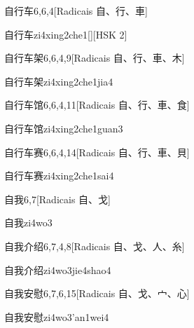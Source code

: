 \begin{entry}{自行车}{6,6,4}[Radicais ⾃、⾏、⾞]
  \begin{phonetics}{自行车}{zi4xing2che1}[][HSK 2]
  \end{phonetics}
\end{entry}

\begin{entry}{自行车架}{6,6,4,9}[Radicais ⾃、⾏、⾞、⽊]
  \begin{phonetics}{自行车架}{zi4xing2che1jia4}
  \end{phonetics}
\end{entry}

\begin{entry}{自行车馆}{6,6,4,11}[Radicais ⾃、⾏、⾞、⾷]
  \begin{phonetics}{自行车馆}{zi4xing2che1guan3}
  \end{phonetics}
\end{entry}

\begin{entry}{自行车赛}{6,6,4,14}[Radicais ⾃、⾏、⾞、⾙]
  \begin{phonetics}{自行车赛}{zi4xing2che1sai4}
  \end{phonetics}
\end{entry}

\begin{entry}{自我}{6,7}[Radicais ⾃、⼽]
  \begin{phonetics}{自我}{zi4wo3}
  \end{phonetics}
\end{entry}

\begin{entry}{自我介绍}{6,7,4,8}[Radicais ⾃、⼽、⼈、⽷]
  \begin{phonetics}{自我介绍}{zi4wo3jie4shao4}
  \end{phonetics}
\end{entry}

\begin{entry}{自我安慰}{6,7,6,15}[Radicais ⾃、⼽、⼧、⼼]
  \begin{phonetics}{自我安慰}{zi4wo3'an1wei4}
  \end{phonetics}
\end{entry}

